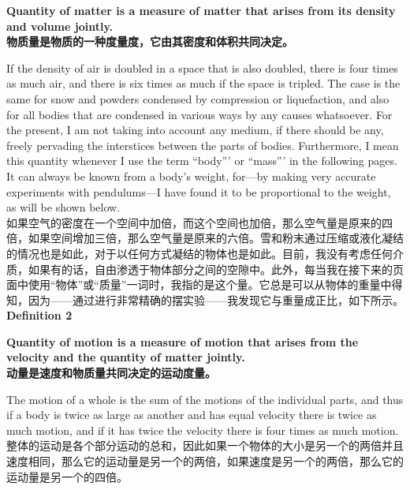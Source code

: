 \documentclass{article}
\begin{document}
\addtolength{\leftskip}{1cm}
\addtolength{\rightskip}{1cm}

\noindent \textbf{Quantity of matter is a measure of matter that arises from its density and volume jointly.}\\
\noindent \textbf{物质量是物质的一种度量度，它由其密度和体积共同决定。}\\

\addtolength{\leftskip}{-1cm}
\addtolength{\rightskip}{-1cm}

\noindent If the density of air is doubled in a space that is also doubled, there is four times as much air, and there is six times as much if the space is tripled. The case is the same for snow and powders condensed by compression or liquefaction, and also for all bodies that are condensed in various ways by any causes whatsoever. For the present, I am not taking into account any medium, if there should be any, freely pervading the interstices between the parts of bodies. Furthermore, I mean this quantity whenever I use the term ``body''' or ``mass''' in the following pages. It can always be known from a body's weight, for—by making very accurate experiments with pendulums—I have found it to be proportional to the weight, as will be shown below.\\
如果空气的密度在一个空间中加倍，而这个空间也加倍，那么空气量是原来的四倍，如果空间增加三倍，那么空气量是原来的六倍。雪和粉末通过压缩或液化凝结的情况也是如此，对于以任何方式凝结的物体也是如此。目前，我没有考虑任何介质，如果有的话，自由渗透于物体部分之间的空隙中。此外，每当我在接下来的页面中使用“物体”或“质量”一词时，我指的是这个量。它总是可以从物体的重量中得知，因为——通过进行非常精确的摆实验——我发现它与重量成正比，如下所示。\\

\noindent\textbf{Definition 2}

\addtolength{\leftskip}{1cm}
\addtolength{\rightskip}{1cm}

\noindent \textbf{Quantity of motion is a measure of motion that arises from the velocity and the quantity of matter jointly.}\\
\noindent \textbf{动量是速度和物质量共同决定的运动度量。}\\

\addtolength{\leftskip}{-1cm}
\addtolength{\rightskip}{-1cm}

\noindent The motion of a whole is the sum of the motions of the individual parts, and thus if a body is twice as large as another and has equal velocity there is twice as much motion, and if it has twice the velocity there is four times as much motion.\\
整体的运动是各个部分运动的总和，因此如果一个物体的大小是另一个的两倍并且速度相同，那么它的运动量是另一个的两倍，如果速度是另一个的两倍，那么它的运动量是另一个的四倍。\\
\end{document}
